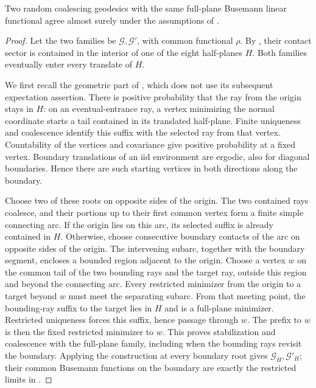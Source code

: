 \begin{proposition}
\label{prop:boundary-uniqueness}
Two random coalescing geodesics with the same full-plane Busemann
linear functional agree almost surely under the assumptions of
.
\end{proposition}
\begin{proof}
Let the two families be \(\mathcal G,\mathcal G'\), with common
functional \(\rho\). By
\cite[Proposition~4.3]{AhlbergHoffman}, their contact sector is
contained in the interior of one of the eight half-planes \(H\).
Both families eventually enter every translate of \(H\).

We first recall the geometric part of
\cite[Lemma~4.6, Section~4.4]{AhlbergHoffman}, which does not use its
subsequent expectation assertion. There is positive probability that
the ray from the origin stays in \(H\): on an eventual-entrance ray,
a vertex minimizing the normal coordinate starts a tail contained in
its translated half-plane. Finite uniqueness and coalescence identify
this suffix with the selected ray from that vertex. Countability of the
vertices and covariance give positive probability at a fixed vertex.
Boundary translations of an iid environment are ergodic, also for
diagonal boundaries. Hence there are such starting vertices in both
directions along the boundary.

Choose two of these roots on opposite sides of the origin. The two
contained rays coalesce, and their portions up to their first common
vertex form a finite simple connecting arc. If the origin lies on this
arc, its selected suffix is already contained in \(H\). Otherwise,
choose consecutive boundary contacts of the arc on opposite sides of
the origin. The intervening subarc, together with the boundary segment,
encloses a bounded region adjacent to the origin. Choose a vertex
\(w\) on the common tail of the two bounding rays and the target ray,
outside this region and beyond the connecting arc. Every restricted
minimizer from the origin to a target beyond \(w\) must meet the
separating subarc. From that meeting point, the bounding-ray suffix to
the target lies in \(H\) and is a full-plane minimizer. Restricted
uniqueness forces this suffix, hence passage through \(w\). The prefix
to \(w\) is then the fixed restricted minimizer to \(w\). This proves
stabilization and coalescence with the full-plane family, including when
the bounding rays revisit the boundary. Applying the construction at
every boundary root gives \(\mathcal G_H,\mathcal G'_H\); their common
Busemann functions on the boundary are exactly the restricted limits
in .


\end{proof}
